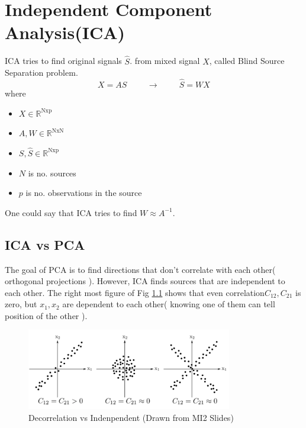 \chapter{Independent Component Analysis(ICA)}

ICA tries to find original signals $\hat{S}$. from mixed signal $X$, called Blind Source Separation problem.
$$
X = AS \hspace{1cm}  \rightarrow \hspace{1cm} \hat{S}  = WX
$$
where 

\begin{itemize}
	\item $X \in \mathbb{R}^{\text{Nxp}}$
	\item $A, W \in \mathbb{R}^{\text{NxN}}$
	\item $S, \hat{S} \in \mathbb{R}^{\text{Nxp}}$
	\item $N$ is no. sources
	\item $p$ is no. observations in the source
\end{itemize}

One could say that ICA tries to find $W \approx A^{-1}$.

\section{ICA vs PCA}

The goal of PCA is to find directions that don't correlate with each other( orthogonal projections ). However, ICA finds sources that are independent to each other.  The right most figure of Fig \ref{fig:ica-decorrleation-vs-independent} shows that even correlation$C_{12}, C_{21}$ is zero, but $x_1, x_2$ are dependent to each other( knowing one of them can tell position of the other ).

\begin{figure}[hbt]
	\center
  \includegraphics[width=0.8\textwidth]{figures/ica-decorrelation-vs-indepedent}
  \caption{Decorrelation vs Indenpendent (Drawn from MI2 Slides)}
  \label{fig:ica-decorrleation-vs-independent}
\end{figure}

